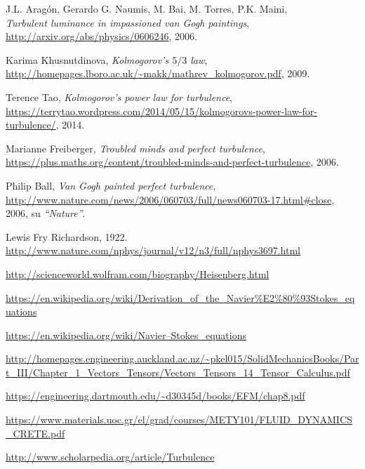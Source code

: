 \documentclass[12pt,a4paper]{article}
\numberwithin{equation}{section}
\begin{document}
\begin{thebibliography}{11}

  J.L. Aragón, Gerardo G. Naumis, M. Bai, M. Torres, P.K. Maini, \\
  \emph{Turbulent luminance in impassioned van Gogh paintings}, \\
  \url{http://arxiv.org/abs/physics/0606246}, 
  2006.

  Karima Khusnutdinova, 
  \emph{Kolmogorov's $5/3$ law}, \\
  \url{http://homepages.lboro.ac.uk/~makk/mathrev_kolmogorov.pdf},
  2009.
  
  Terence Tao,
  \emph{Kolmogorov’s power law for turbulence}, \\
  \url{https://terrytao.wordpress.com/2014/05/15/kolmogorovs-power-law-for-turbulence/}, 2014.

  Marianne Freiberger, 
  \emph{Troubled minds and perfect turbulence}, \\
  \url{https://plus.maths.org/content/troubled-minds-and-perfect-turbulence},
  2006.
  
  Philip Ball, 
  \emph{Van Gogh painted perfect turbulence}, \\
  \url{http://www.nature.com/news/2006/060703/full/news060703-17.html#close},
  2006,
  su \emph{``Nature''}.
  
  Lewis Fry Richardson, 1922.
  \url{http://www.nature.com/nphys/journal/v12/n3/full/nphys3697.html}

  \url{http://scienceworld.wolfram.com/biography/Heisenberg.html}

  \url{https://en.wikipedia.org/wiki/Derivation_of_the_Navier%E2%80%93Stokes_equations}
  
  \url{https://en.wikipedia.org/wiki/Navier–Stokes_equations}

  \url{http://homepages.engineering.auckland.ac.nz/~pkel015/SolidMechanicsBooks/Part_III/Chapter_1_Vectors_Tensors/Vectors_Tensors_14_Tensor_Calculus.pdf}

  \url{https://engineering.dartmouth.edu/~d30345d/books/EFM/chap8.pdf}

  \url{https://www.materials.uoc.gr/el/grad/courses/METY101/FLUID_DYNAMICS_CRETE.pdf}     

  \url{http://www.scholarpedia.org/article/Turbulence}
  

\end{thebibliography}
\end{document}
